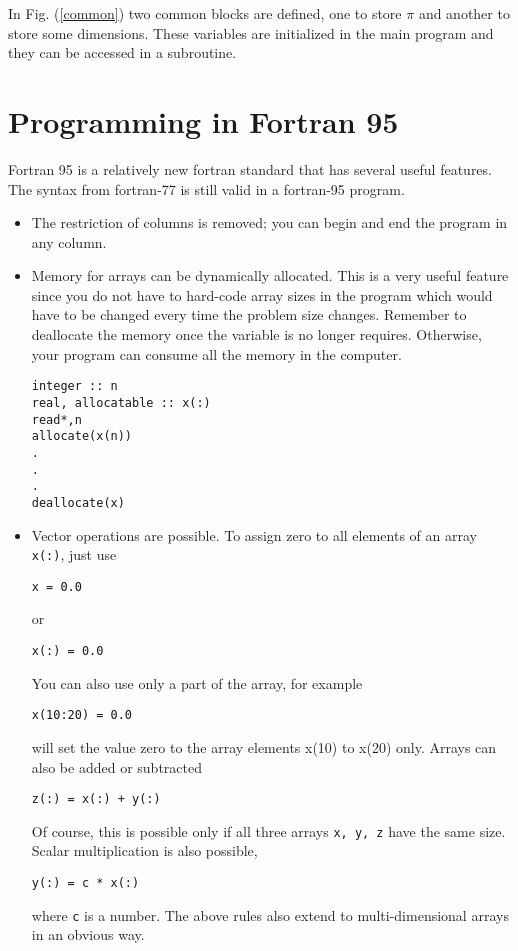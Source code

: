 \documentclass[11pt,oneside]{amsart}
\begin{document}
In Fig. (\ref{common}) two common blocks are defined, one to store $\pi$ and another to store some dimensions. These variables are initialized in the main program and they can be accessed in a subroutine.

\section{Programming in Fortran 95}
\label{f95}
Fortran 95 is a relatively new fortran standard that has several useful features. The syntax from fortran-77 is still valid in a fortran-95 program.

\begin{itemize}

\item The restriction of columns is removed; you can begin and end the program in any column. 

\item Memory for arrays can be dynamically allocated. This is a very useful feature since you do not have to hard-code array sizes in the program which would have to be changed every time the problem size changes. Remember to deallocate the memory once the variable is no longer requires. Otherwise, your program can consume all the memory in the computer.
\begin{verbatim}
integer :: n
real, allocatable :: x(:)
read*,n
allocate(x(n))
.
.
.
deallocate(x)
\end{verbatim}

\item Vector operations are possible. To assign zero to all elements of an array {\tt x(:)}, just use
\begin{verbatim}
x = 0.0
\end{verbatim}
or
\begin{verbatim}
x(:) = 0.0
\end{verbatim}
You can also use only a part of the array, for example
\begin{verbatim}
x(10:20) = 0.0
\end{verbatim}
will set the value zero to the array elements x(10) to x(20) only. Arrays can also be added or subtracted
\begin{verbatim}
z(:) = x(:) + y(:)
\end{verbatim}
Of course, this is possible only if all three arrays {\tt x, y, z} have the same size. Scalar multiplication is also possible,
\begin{verbatim}
y(:) = c * x(:)
\end{verbatim}
where {\tt c} is a number. The above rules also extend to multi-dimensional arrays in an obvious way.


\end{itemize}
\end{document}
